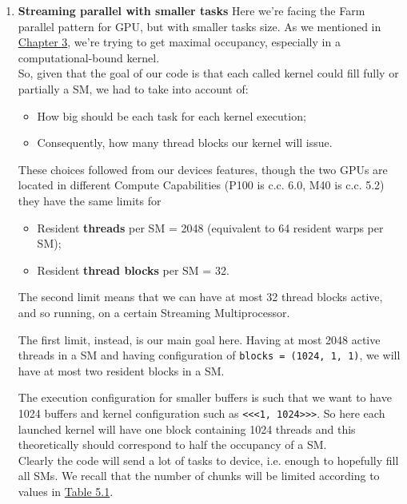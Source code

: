 \begin{enumerate}
		
	\item \textbf{Streaming parallel with smaller tasks}
		Here we're facing the Farm parallel pattern for GPU, but with smaller tasks size.
		As we mentioned in \hyperref[chap:logic]{Chapter 3}, we're trying to get maximal occupancy, especially in a computational-bound kernel.\\
		So, given that the goal of our code is that each called kernel could fill fully or partially a SM, we had to take into account of: 
		\begin{itemize}
			\item How big should be each task for each kernel execution;
			\item Consequently, how many thread blocks our kernel will issue.
		\end{itemize}
		These choices followed from our devices features, though the two GPUs are located in different Compute Capabilities (P100 is c.c. 6.0, M40 is c.c. 5.2) they have the same limits for 
		\begin{itemize}
			\item Resident \textbf{threads} per SM = 2048 (equivalent to 64 resident warps per SM);
			\item Resident \textbf{thread blocks} per SM = 32.
		\end{itemize}
		The second limit means that we can have at most 32 thread blocks active, and so running, on a certain Streaming Multiprocessor. 
		
		The first limit, instead, is our main goal here. Having at most 2048 active threads in a SM and having configuration of \texttt{blocks = (1024, 1, 1)}, we will have at most two resident blocks in a SM.
		
		The execution configuration for smaller buffers is such that we want to have 1024 buffers and kernel configuration such as \texttt{<<<1, 1024>>>}. 
		So here each launched kernel will have one block containing 1024 threads and this theoretically should correspond to half the occupancy of a SM.\\
		Clearly the code will send a lot of tasks to device, i.e. enough to hopefully fill all SMs. We recall that the number of chunks will be limited according to values in \hyperref[tab:cosdata]{Table 5.1}.
		

\end{enumerate}

